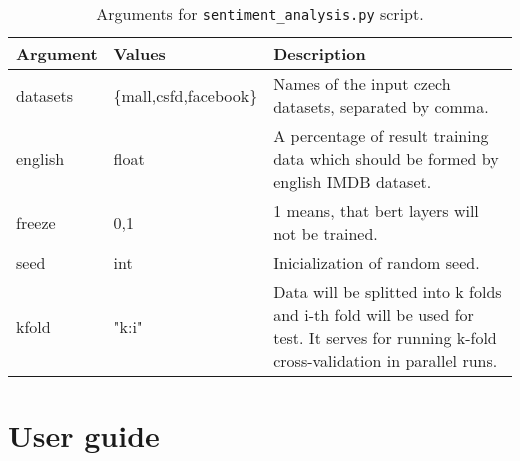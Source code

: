 \begin{table}
\centering
\label{Tab:sent_args}
\begin{tabular}{ |p{2cm}|p{}|p{6cm}| } 
 \hline
 Argument & Values & Description \\ 
 \hline \hline
 datasets & \{mall,csfd,facebook\} &  Names of the input czech datasets, separated by comma. \\ \hline
 english & float & A percentage of result training data which should be formed by english IMDB dataset.\\ \hline
 
 freeze & {0,1} & 1 means, that bert layers will not be trained. \\ \hline
 seed & int & Inicialization of random seed. \\ \hline
 kfold & "k:i" & Data will be splitted into k folds and i-th fold will be used for test. It serves for running k-fold cross-validation in parallel runs. \\ \hline
 
 \hline
\end{tabular}
\caption{Arguments for \texttt{sentiment\_analysis.py} script.} 
\end{table}


\section{User guide}






